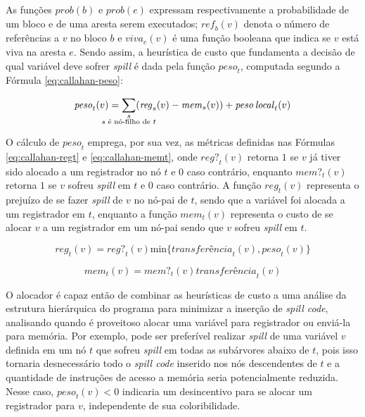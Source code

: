 \documentclass[
	12pt,				%
	openright,			%
	twoside,			%
	a4paper,			%
	tcc,			%
	]{ABNT-DC-UEL}
\begin{document}
As funções $\mathit{prob}(b)$ e $\mathit{prob}(e)$ expressam respectivamente a probabilidade de um bloco e de uma aresta serem executados; $\mathit{ref}_b(v)$ denota o número de referências a $v$ no bloco $b$ e $\mathit{viva}_e(v)$ é uma função booleana que indica se $v$ está viva na aresta $e$. Sendo assim, a heurística de custo que fundamenta a decisão de qual variável deve sofrer \textit{spill} é dada pela função $\mathit{peso}_t$, computada segundo a Fórmula \ref{eq:callahan-peso}:

\begin{equation}
    \mathit{peso}_t(v) = \sum_{\mathclap{\substack{s\\s \text{ é nó-filho de } t}}} (\mathit{reg}_s(v) - \mathit{mem}_s(v)) + \mathit{peso\,local}_t(v)
    \label{eq:callahan-peso}
\end{equation}

O cálculo de $\mathit{peso}_t$ emprega, por sua vez, as métricas definidas nas Fórmulas \ref{eq:callahan-regt} e \ref{eq:callahan-memt}, onde $\mathit{reg?}_t(v)$ retorna $1$ se $v$ já tiver sido alocado a um registrador no nó $t$ e $0$ caso contrário, enquanto $\mathit{mem?}_t(v)$ retorna $1$ se $v$ sofreu \textit{spill} em $t$ e $0$ caso contrário. A função $\mathit{reg}_t(v)$ representa o prejuízo de se fazer \textit{spill} de $v$ no nó-pai de $t$, sendo que a variável foi alocada a um registrador em $t$, enquanto a função $\mathit{mem}_t(v)$ representa o custo de se alocar $v$ a um registrador em um nó-pai sendo que $v$ sofreu \textit{spill} em $t$.

\begin{equation}
    \mathit{reg}_t(v) = \mathit{reg?}_t(v)\text{min}\{\textit{transferência}_t(v), \mathit{peso}_t(v)\}
    \label{eq:callahan-regt}
\end{equation}

\begin{equation}
    \mathit{mem}_t(v) = \mathit{mem?}_t(v)\textit{transferência}_t(v)
    \label{eq:callahan-memt}
\end{equation}

O alocador é capaz então de combinar as heurísticas de custo a uma análise da estrutura hierárquica do programa para minimizar a inserção de \textit{spill code}, analisando quando é proveitoso alocar uma variável para registrador ou enviá-la para memória. Por exemplo, pode ser preferível realizar \textit{spill} de uma variável $v$ definida em um nó $t$ que sofreu \textit{spill} em todas as subárvores abaixo de $t$, pois isso tornaria desnecessário todo o \textit{spill code} inserido nos nós descendentes de $t$ e a quantidade de instruções de acesso a memória seria potencialmente reduzida. Nesse caso, $\mathit{peso}_t(v) < 0$ indicaria um desincentivo para se alocar um registrador para $v$, independente de sua coloribilidade.
\end{document}
